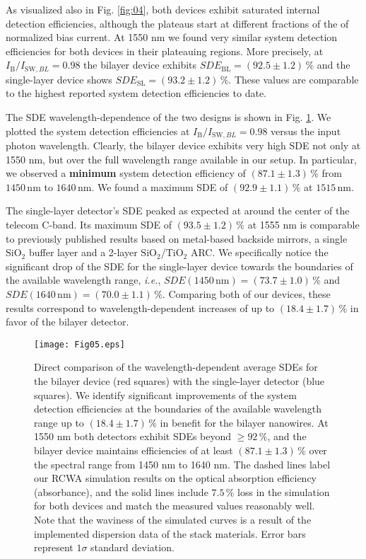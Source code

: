 \documentclass[aip,apl,showpacs,showkeys,preprint,superscriptaddress,preprintnumbers,amsmath,amssymb]{revtex4-1}
\begin{document}
\begin{bibunit}
As visualized also in Fig. \ref{fig:04}, both devices exhibit saturated internal detection efficiencies, although the plateaus start at different fractions of the of normalized bias current.  At 1550 nm we found very similar system detection efficiencies for both devices in their plateauing regions. More precisely, at $I_\mathrm{B}/I_{\mathrm{SW},BL}=0.98$ the bilayer device exhibits $SDE_\mathrm{BL}=\left(92.5\pm1.2\right)\,\%$ and the single-layer device shows $SDE_\mathrm{SL}=\left(93.2\pm1.2\right)\,\%$. These values are comparable to the highest reported system detection efficiencies to date. 

The SDE wavelength-dependence of the two designs is shown in Fig. \ref{fig:05}. We plotted the system detection efficiencies at $I_\mathrm{B}/I_{\mathrm{SW},BL}=0.98$ versus the input photon wavelength. Clearly, the bilayer device exhibits very high SDE not only at 1550 nm, but over the full wavelength range available in our setup. In particular, we observed a \textbf{minimum} system detection efficiency of $\left(87.1\pm1.3\right)\,\%$ from $1450\,\mathrm{nm}$ to $1640\,\mathrm{nm}$. We found a maximum SDE of $\left(92.9\pm1.1\right)\,\%$ at $1515\,\mathrm{nm}$.

The single-layer detector's SDE peaked as expected at around the center of the telecom C-band. Its maximum SDE of $\left(93.5\pm1.2\right)\,\%$ at 1555 nm is comparable to previously published results based on metal-based backside mirrors, a single $\mathrm{SiO}_2$ buffer layer and a 2-layer $\mathrm{SiO}_2$/$\mathrm{TiO}_2$ ARC\cite{Marsili2013}. We specifically notice the significant drop of the SDE for the single-layer device towards the boundaries of the available wavelength range, \textit{i.e.}, $SDE\left(1450\,\mathrm{nm}\right)=\left(73.7\pm1.0\right)\,\%$ and $SDE\left(1640\,\mathrm{nm}\right)=\left(70.0\pm1.1\right)\,\%$. Comparing both of our devices, these results correspond to wavelength-dependent increases of up to $\left(18.4\pm1.7\right)\,\%$ in favor of the bilayer detector. 

\begin{figure}
\texttt{[image: Fig05.eps]}
\caption{\label{fig:05} Direct comparison of the wavelength-dependent average SDEs for the bilayer device (red squares) with the single-layer detector (blue squares). We identify significant improvements of the system detection efficiencies at the boundaries of the available wavelength range up to $\left(18.4\pm1.7\right)\,\%$ in benefit for the bilayer nanowires. At 1550 nm both detectors exhibit SDEs beyond $\ge92\,\%$, and the bilayer device maintains efficiencies of at least $\left(87.1\pm1.3\right)\,\%$ over the spectral range from 1450 nm to 1640 nm. The dashed lines label our RCWA simulation results on the optical absorption efficiency (absorbance), and the solid lines include $7.5\,\%$ loss in the simulation for both devices and match the measured values reasonably well. Note that the waviness of the simulated curves is a result of the implemented dispersion data of the stack materials. Error bars represent $1\sigma$ standard deviation.}
\end{figure}


\end{bibunit}
\end{document}
